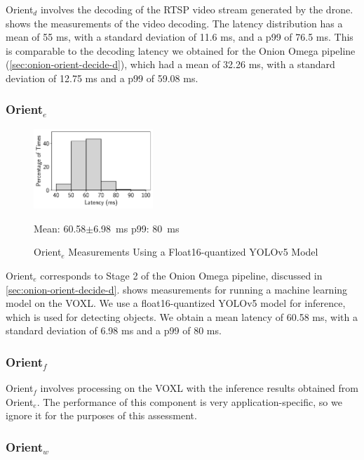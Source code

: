 Orient$_d$ involves the decoding of the RTSP video stream generated by the
drone.   shows the measurements of the video
decoding. The latency distribution has a mean of 55 ms, with a standard
deviation of 11.6 ms, and a p99 of 76.5 ms. This is comparable to the decoding
latency we obtained for the Onion Omega pipeline
(\cref{sec:onion-orient-decide-d}), which had a mean of 32.26 ms, with a
standard deviation of 12.75 ms and a p99 of 59.08 ms.

\subsubsection*{Orient$_{e}$}

\begin{figure}[htbp]
\centerline{\includegraphics[width = 0.4\textwidth]{figs/onboard-inference-hist.pdf}}
\centering
Mean: 60.58$\pm$6.98~ms\; p99: 80~ms\\
\caption{Orient$_e$ Measurements Using a Float16-quantized YOLOv5 Model}
\label{fig:voxl2-inference-hist}
\end{figure}

Orient$_e$ corresponds to Stage 2 of the Onion Omega pipeline, discussed in
\cref{sec:onion-orient-decide-d}.  shows
measurements for running a machine learning model on the VOXL. We use a
float16-quantized YOLOv5 model for inference, which is used for detecting
objects. We obtain a mean latency of 60.58 ms, with a standard deviation of
6.98 ms and a p99 of 80 ms.

\subsubsection*{Orient$_{f}$}

Orient$_f$ involves processing on the VOXL with the inference results obtained
from Orient$_e$. The performance of this component is very application-specific,
so we ignore it for the purposes of this assessment.

\subsubsection*{Orient$_{w}$}

